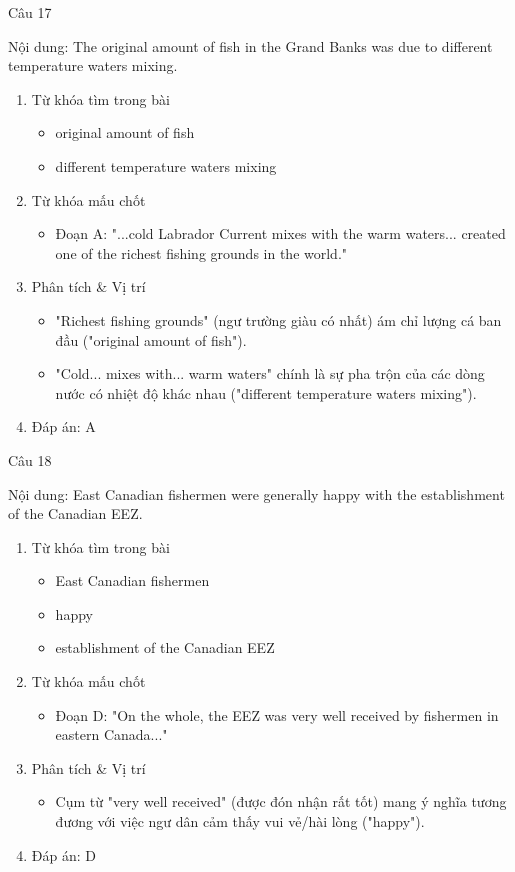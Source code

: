 \documentclass{../templateReading/cdreading}
\begin{document}
Câu 17

Nội dung: The original amount of fish in the Grand Banks was due to different temperature waters mixing.
\begin{enumerate}
\item Từ khóa tìm trong bài
\begin{itemize}
\item original amount of fish
\item different temperature waters mixing
\end{itemize}
\item Từ khóa mấu chốt
\begin{itemize}
\item Đoạn A: "...cold Labrador Current mixes with the warm waters... created one of the richest fishing grounds in the world."
\end{itemize}
\item Phân tích \& Vị trí
\begin{itemize}
\item "Richest fishing grounds" (ngư trường giàu có nhất) ám chỉ lượng cá ban đầu ("original amount of fish").
\item "Cold... mixes with... warm waters" chính là sự pha trộn của các dòng nước có nhiệt độ khác nhau ("different temperature waters mixing").
\end{itemize}
\item Đáp án: A
\end{enumerate}

Câu 18

Nội dung: East Canadian fishermen were generally happy with the establishment of the Canadian EEZ.
\begin{enumerate}
\item Từ khóa tìm trong bài
\begin{itemize}
\item East Canadian fishermen
\item happy
\item establishment of the Canadian EEZ
\end{itemize}
\item Từ khóa mấu chốt
\begin{itemize}
\item Đoạn D: "On the whole, the EEZ was very well received by fishermen in eastern Canada..."
\end{itemize}
\item Phân tích \& Vị trí
\begin{itemize}
\item Cụm từ "very well received" (được đón nhận rất tốt) mang ý nghĩa tương đương với việc ngư dân cảm thấy vui vẻ/hài lòng ("happy").
\end{itemize}
\item Đáp án: D
\end{enumerate}
\end{document}
